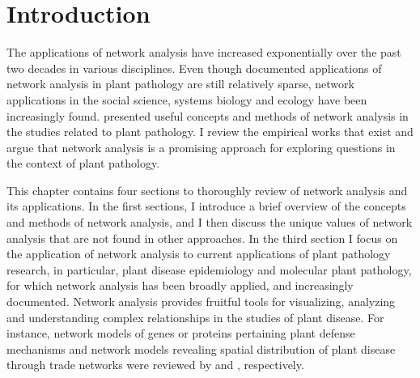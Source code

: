 \section*{Introduction}

The applications of network analysis have increased exponentially over the past two decades in various disciplines. Even though documented applications of network analysis in plant pathology are still relatively sparse, network applications in the social science, systems biology and ecology have been increasingly found.  presented useful concepts and methods of network analysis in the studies related to plant pathology. I review the empirical works that exist and argue that network analysis is a promising approach for exploring questions in the context of plant pathology.

This chapter contains four sections to thoroughly review of network analysis and its applications. In the first sections, I introduce a brief overview of the concepts and methods of network analysis, and I then discuss the unique values of network analysis that are not found in other approaches. In the third section I focus on the application of network analysis to current applications of plant pathology research, in particular, plant disease epidemiology and molecular plant pathology, for which network analysis has been broadly applied, and increasingly documented. Network analysis provides fruitful tools for visualizing, analyzing and understanding complex relationships in the studies of plant disease. For instance, network models of genes or proteins pertaining plant defense mechanisms and network models revealing spatial distribution of plant disease through trade networks were reviewed by  and , respectively.

